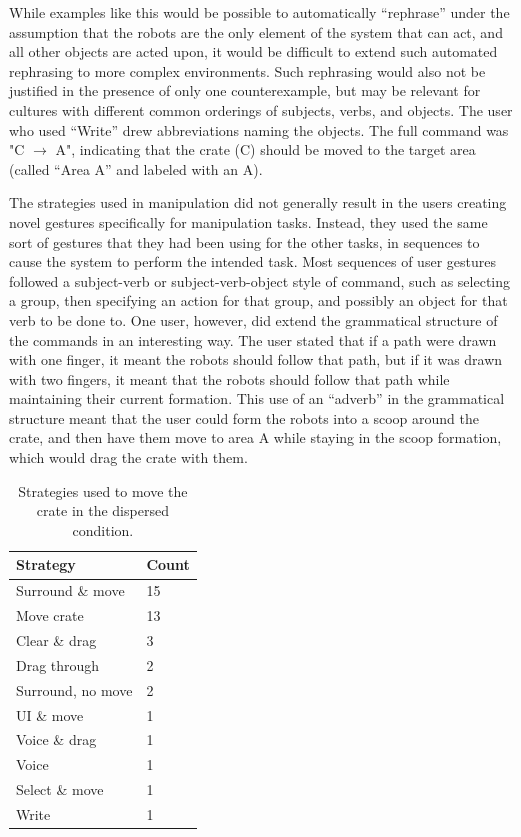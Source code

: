 While examples like this would be possible to automatically ``rephrase'' under the assumption that the robots are the only element of the system that can act, and all other objects are acted upon, it would be difficult to extend such automated rephrasing to more complex environments. 
Such rephrasing would also not be justified in the presence of only one counterexample, but may be relevant for cultures with different common orderings of subjects, verbs, and objects. 
The user who used ``Write'' drew abbreviations naming the objects. The full command was "C $\rightarrow$ A", indicating that the crate (C) should be moved to the target area (called ``Area A'' and labeled with an A).

The strategies used in manipulation did not generally result in the users creating novel gestures specifically for manipulation tasks. 
Instead, they used the same sort of gestures that they had been using for the other tasks, in sequences to cause the system to perform the intended task. 
Most sequences of user gestures followed a subject-verb or subject-verb-object style of command, such as selecting a group, then specifying an action for that group, and possibly an object for that verb to be done to.
One user, however, did extend the grammatical structure of the commands in an interesting way. 
The user stated that if a path were drawn with one finger, it meant the robots should follow that path, but if it was drawn with two fingers, it meant that the robots should follow that path while maintaining their current formation. 
This use of an ``adverb'' in the grammatical structure meant that the user could form the robots into a scoop around the crate, and then have them move to area A while staying in the scoop formation, which would drag the crate with them. 

\begin{table}
	\begin{tabular}{l l}
		Strategy & Count\\
		\hline
		Surround \& move & 15\\
		Move crate & 13\\
		Clear \& drag & 3\\
		Drag through & 2\\
		Surround, no move & 2\\
		UI \& move & 1\\
		Voice \& drag & 1\\
		Voice & 1\\
		Select \& move & 1 \\
		Write & 1\\
	\end{tabular}
	\caption{Strategies used to move the crate in the dispersed condition.}
	\label{tab:dispersed_crate_strategies}
\end{table}

